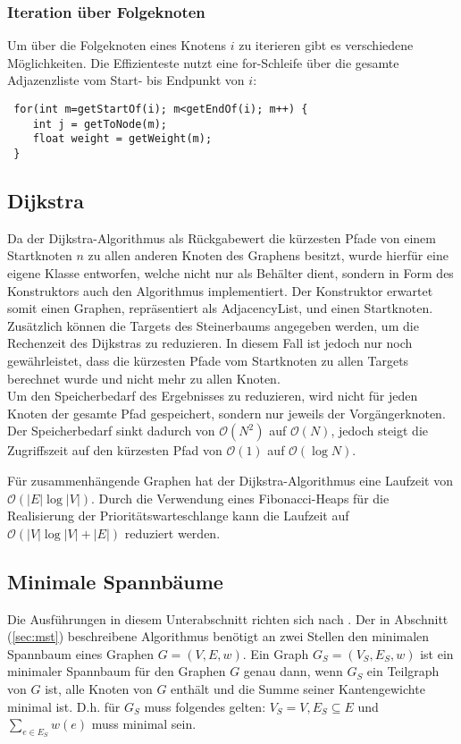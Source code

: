 \documentclass[a4paper,10pt]{article}
\begin{document}
\subsubsection{Iteration über Folgeknoten}
Um über die Folgeknoten eines Knotens $i$ zu iterieren gibt es verschiedene Möglichkeiten.
Die Effizienteste nutzt eine for-Schleife über die gesamte Adjazenzliste vom Start- bis Endpunkt von $i$:
\begin{lstlisting}
 for(int m=getStartOf(i); m<getEndOf(i); m++) {
    int j = getToNode(m);
    float weight = getWeight(m);
 }
\end{lstlisting}

\subsection{Dijkstra}
Da der Dijkstra-Algorithmus als Rückgabewert die kürzesten Pfade von einem Startknoten $n$ zu allen anderen Knoten des Graphens besitzt,
wurde hierfür eine eigene Klasse entworfen, welche nicht nur als Behälter dient, sondern in Form des Konstruktors auch den Algorithmus implementiert.
Der Konstruktor erwartet somit einen Graphen, repräsentiert als AdjacencyList, und einen Startknoten. Zusätzlich können die Targets des Steinerbaums
angegeben werden, um die Rechenzeit des Dijkstras zu reduzieren. In diesem Fall ist jedoch nur noch gewährleistet, dass die kürzesten Pfade vom Startknoten
zu allen Targets berechnet wurde und nicht mehr zu allen Knoten.\\
Um den Speicherbedarf des Ergebnisses zu reduzieren, wird nicht für jeden Knoten der gesamte Pfad gespeichert, sondern nur jeweils der Vorgängerknoten.
Der Speicherbedarf sinkt dadurch von $\mathcal{O}(N^2)$ auf $\mathcal{O}(N)$, jedoch steigt die Zugriffszeit auf den kürzesten Pfad von $\mathcal{O}(1)$ auf $\mathcal{O}(\log{}N)$.
\smallskip

Für zusammenhängende Graphen hat der Dijkstra-Algorithmus eine Laufzeit von $\mathcal{O}(|E|\log|V|)$. Durch die Verwendung eines Fibonacci-Heaps
für die Realisierung der Prioritätswarteschlange kann die Laufzeit auf $\mathcal{O}(|V|\log|V| + |E|)$ reduziert werden.

\subsection{Minimale Spannbäume}
Die Ausführungen in diesem Unterabschnitt richten sich nach \cite[Kapitel 23]{cormen}.
Der in Abschnitt (\ref{sec:mst}) beschreibene Algorithmus benötigt an zwei Stellen den minimalen Spannbaum eines Graphen $G=(V,E,w)$. Ein Graph
$G_S=(V_S,E_S,w)$ ist ein minimaler Spannbaum für den Graphen $G$ genau dann, wenn $G_S$ ein Teilgraph von $G$ ist, alle Knoten von $G$ enthält und die Summe seiner Kantengewichte minimal ist. D.h. für $G_S$ muss folgendes gelten: $V_S=V, E_S \subseteq E$ und $\sum_{e \in E_S} w(e)$ muss minimal sein.
\smallskip
\end{document}
